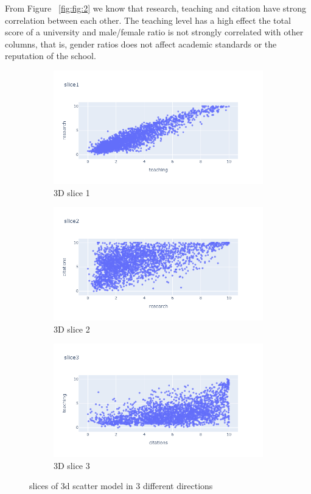 \documentclass[a4paper]{article}
\begin{document}
\FloatBarrier
From Figure ~\ref{fig:fig:2} we know that research, teaching and citation have strong correlation between each other. The teaching level has a high effect the total score of a university and male/female ratio is not strongly correlated with other columns, that is, gender ratios does not affect academic standards or the reputation of the school.
\FloatBarrier
\begin{figure}[h]
    \centering
    \begin{subfigure}{\textwidth}
        \centering
        \includegraphics[width=0.7\linewidth]{images/WPlot3.png}
        \caption{3D slice 1}
        \label{subfig:1}
    \end{subfigure}
    \begin{subfigure}{\textwidth}
        \centering
        \includegraphics[width=0.7\linewidth]{images/WPlot4.png}
        \caption{3D slice 2}
        \label{subfig:2}
    \end{subfigure}
    \begin{subfigure}{\textwidth}
        \centering
        \includegraphics[width=0.7\linewidth]{images/WPlot5.png}
        \caption{3D slice 3}
        \label{subfig:3}
    \end{subfigure}
    \caption{slices of 3d scatter model in 3 different directions}
    \label{fig:fig:3}
\end{figure}
\end{document}
